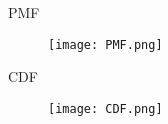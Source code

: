 \documentclass{beamer}
\begin{document}
\begin{frame}{PMF}

\begin{figure}[h]
\centering
\texttt{[image: PMF.png]}
\label{Fig2}
\end{figure}

\end{frame}

\begin{frame}{CDF}

\begin{figure}[h]
\centering
\texttt{[image: CDF.png]}
\label{Fig1}
\end{figure}

\end{frame}
\end{document}
